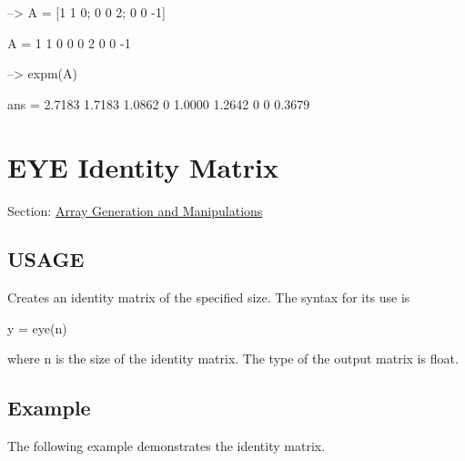 \begin{DoxyVerbInclude}
--> A = [1 1 0; 0 0 2; 0 0 -1]

A = 
  1  1  0 
  0  0  2 
  0  0 -1 

--> expm(A)

ans = 
    2.7183    1.7183    1.0862 
         0    1.0000    1.2642 
         0         0    0.3679 
\end{DoxyVerbInclude}
 \hypertarget{array_eye}{}\section{E\-Y\-E Identity Matrix}\label{array_eye}
Section\-: \hyperlink{sec_array}{Array Generation and Manipulations} \hypertarget{typecast_dec2bin_USAGE}{}\subsection{U\-S\-A\-G\-E}\label{typecast_dec2bin_USAGE}
Creates an identity matrix of the specified size. The syntax for its use is \begin{DoxyVerb}   y = eye(n)
\end{DoxyVerb}
 where {\ttfamily n} is the size of the identity matrix. The type of the output matrix is {\ttfamily float}. \hypertarget{variables_struct_Example}{}\subsection{Example}\label{variables_struct_Example}
The following example demonstrates the identity matrix.


